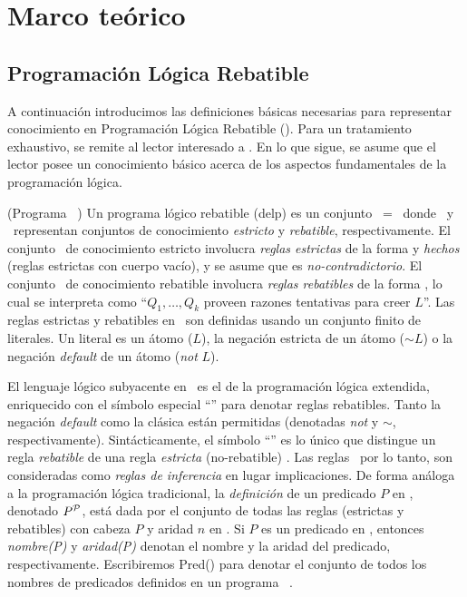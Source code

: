 \section{Marco teórico}

\subsection{Programación Lógica Rebatible}


A continuación introducimos las definiciones básicas necesarias para representar conocimiento
en Programación Lógica Rebatible (\DLP). Para un tratamiento exhaustivo, se remite al lector
interesado a %
. En lo que sigue, se asume que el lector posee un conocimiento básico acerca de los aspectos
fundamentales de la programación lógica.

\begin{definicion}(Programa \DLP\ \PP)
	Un programa lógico rebatible (delp) es un conjunto \PP\ = \SD\ donde \SSet\ y \DD\ representan conjuntos
	de conocimiento \textit{estricto} y \textit{rebatible}, respectivamente. El conjunto \SSet\ de 
	conocimiento estricto involucra \textit{reglas estrictas} de la forma  y 					\textit{hechos} (reglas estrictas con cuerpo vacío), y se asume que es \textit{no-contradictorio}. 
	El conjunto \DD\ de conocimiento rebatible involucra \textit{reglas rebatibles} de la forma 
	, lo cual se interpreta como ``$Q_1,\ldots,Q_k$ proveen razones tentativas 
	para creer $L$''. Las reglas estrictas y rebatibles en \DLP\ son definidas usando un conjunto 
	finito de literales. Un literal es un átomo ($L$), la negación estricta de un átomo ($\sim L$) o 
	la negación \textit{default} de un átomo (\textit{not} $L$).
\end{definicion}

El lenguaje lógico subyacente en \DLP\ es el de la programación lógica extendida, %
enriquecido con el símbolo especial ``\drule{}{}'' para denotar reglas rebatibles. Tanto la negación 
\textit{default} como la clásica están permitidas (denotadas \textit{not} y \textit{$\sim$}, respectivamente).
Sintácticamente, el símbolo ``\drule{}{}'' es lo único que distingue un regla \textit{rebatible} 
 de una regla \textit{estricta} (no-rebatible) . 
Las reglas \DLP\, por lo tanto, son consideradas como \textit{reglas de inferencia} en lugar implicaciones.
De forma análoga a la programación lógica tradicional, la \textit{definición} de un predicado $P$ en \PP ,
denotado $P^{\scriptsize{\mbox{${\mathcal P}$}}}$, está dada por el conjunto de todas las reglas (estrictas y rebatibles) con cabeza $P$ 
y aridad $n$ en \PP . Si $P$ es un predicado en \PP , entonces \textit{nombre(P)} y \textit{aridad(P)} denotan
el nombre y la aridad del predicado, respectivamente. Escribiremos \textsf{Pred}(\PP) para denotar el conjunto
de todos los nombres de predicados definidos en un programa \DLP\ \PP.


